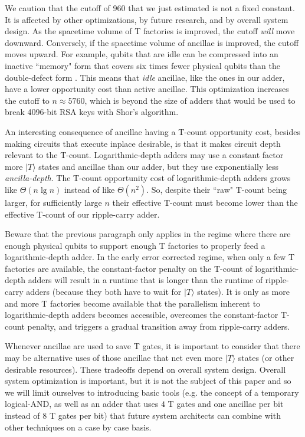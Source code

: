 \documentclass[twocolumn,accepted=2018-05-25]{quantumarticle}
\begin{document}
We caution that the cutoff of 960 that we just estimated is not a fixed constant.
It is affected by other optimizations, by future research, and by overall system design.
As the spacetime volume of T factories is improved, the cutoff {\em will} move downward.
Conversely, if the spacetime volume of ancillae is improved, the cutoff moves upward.
For example, qubits that are idle can be compressed into an inactive ``memory" form that covers six times fewer physical qubits than the double-defect form \cite{horsman2012}.
This means that {\em idle} ancillae, like the ones in our adder, have a lower opportunity cost than active ancillae.
This optimization increases the cutoff to $n \approx 5760$, which is beyond the size of adders that would be used to break 4096-bit RSA keys with Shor's algorithm.

An interesting consequence of ancillae having a T-count opportunity cost, besides making circuits that execute inplace desirable, is that it makes circuit depth relevant to the T-count.
Logarithmic-depth adders may use a constant factor more $|T\rangle$ states and ancillae than our adder, but they use exponentially less {\em ancilla-depth}.
The T-count opportunity cost of logarithmic-depth adders grows like $\Theta(n \lg n)$ instead of like $\Theta(n^2)$.
So, despite their ``raw" T-count being larger, for sufficiently large $n$ their effective T-count must become lower than the effective T-count of our ripple-carry adder.

Beware that the previous paragraph only applies in the regime where there are enough physical qubits to support enough T factories to properly feed a logarithmic-depth adder.
In the early error corrected regime, when only a few T factories are available, the constant-factor penalty on the T-count of logarithmic-depth adders will result in a runtime that is longer than the runtime of ripple-carry adders (because they both have to wait for $|T\rangle$ states).
It is only as more and more T factories become available that the parallelism inherent to logarithmic-depth adders becomes accessible, overcomes the constant-factor T-count penalty, and triggers a gradual transition away from ripple-carry adders.

Whenever ancillae are used to save T gates, it is important to consider that there may be alternative uses of those ancillae that net even more $|T\rangle$ states (or other desirable resources).
These tradeoffs depend on overall system design.
Overall system optimization is important, but it is not the subject of this paper and so we will limit ourselves to introducing basic tools (e.g. the concept of a temporary logical-AND, as well as an adder that uses $4$ T gates and one ancillae per bit instead of $8$ T gates per bit) that future system architects can combine with other techniques on a case by case basis.
\end{document}
